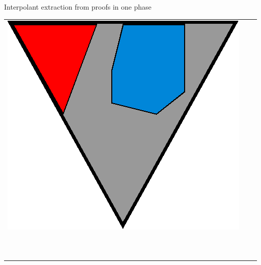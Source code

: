 \documentclass[final,hyperref={pdfpagelabels=true}]{beamer}
\begin{document}
\begin{frame}
\begin{columns}[t]
\begin{column}{\mycolwidth}
\begin{block}{Interpolant extraction from proofs in one phase}
\begin{tabular}{p{}ll}
					\multicolumn{1}{m{\fakemulticolwidth}}{
						\includegraphics[width=\proofwidth]{figures/two_phase_draft_proof}
					}
					&
						\vspace*{0.5em}
					\\



	\multicolumn{2}{l}{
		\proofindent{\stagearrow} ~\parbox[c]{15em}{\raggedright\emph{ \onePhaseArrowLabel } }
						\vspace*{0.5em}
				}
				 \\


			 


\end{tabular}
\end{block}
\end{column}
\end{columns}
\end{frame}
\end{document}
